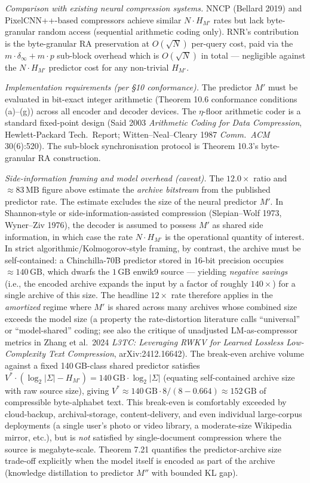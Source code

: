 \documentclass[
]{article}
\begin{document}
\emph{Comparison with existing neural compression systems.}
NNCP (Bellard 2019) and PixelCNN++-based compressors achieve similar
$N \cdot H_{M'}$ rates but lack byte-granular random access (sequential
arithmetic coding only). RNR's contribution is the byte-granular RA
preservation at $O(\sqrt{N})$ per-query cost, paid via the
$m \cdot \delta_\infty + m \cdot p$ sub-block overhead which is
$O(\sqrt{N})$ in total — negligible against the $N \cdot H_{M'}$
predictor cost for any non-trivial $H_{M'}$.

\emph{Implementation requirements (per §10 conformance).} The
predictor $M'$ must be evaluated in bit-exact integer arithmetic
(Theorem 10.6 conformance conditions (a)--(g)) across all encoder
and decoder devices. The $\eta$-floor arithmetic coder is a standard
fixed-point design (Said 2003 \emph{Arithmetic Coding for Data
Compression}, Hewlett-Packard Tech.\ Report; Witten--Neal--Cleary
1987 \emph{Comm.\ ACM} 30(6):520). The sub-block synchronisation
protocol is Theorem 10.3's byte-granular RA construction.

\emph{Side-information framing and model overhead (caveat).}
The $12.0\times$ ratio and $\approx 83\,\mathrm{MB}$ figure above
estimate the \emph{archive bitstream} from the published predictor rate.
The estimate excludes the size of the neural predictor $M'$.
In Shannon-style or side-information-assisted compression
(Slepian--Wolf 1973, Wyner--Ziv 1976), the decoder is assumed to
possess $M'$ as shared side information, in which case the rate
$N \cdot H_{M'}$ is the operational quantity of interest. In strict
algorithmic/Kolmogorov-style framing, by contrast, the archive must
be self-contained: a Chinchilla-70B predictor stored in 16-bit
precision occupies $\approx 140\,\mathrm{GB}$, which dwarfs the
$1\,\mathrm{GB}$ enwik9 source --- yielding \emph{negative savings}
(i.e., the encoded archive expands the input by a factor of roughly
$140\times$) for a single archive of this size. The headline
$12\times$ rate therefore applies in the \emph{amortized} regime where
$M'$ is shared across many archives whose combined size exceeds the
model size (a property the rate-distortion literature calls
``universal'' or ``model-shared'' coding; see also the critique of
unadjusted LM-as-compressor metrics in Zhang et al.\ 2024
\emph{L3TC: Leveraging RWKV for Learned Lossless Low-Complexity Text
Compression}, arXiv:2412.16642). The break-even archive volume against
a fixed 140\,GB-class shared predictor satisfies
$V^* \cdot (\log_2|\Sigma| - H_{M'}) = 140\,\mathrm{GB} \cdot \log_2|\Sigma|$
(equating self-contained archive size with raw source size), giving
$V^* \approx 140\,\mathrm{GB} \cdot 8 / (8 - 0.664) \approx 152\,\mathrm{GB}$
of compressible byte-alphabet text. This break-even is comfortably
exceeded by cloud-backup, archival-storage, content-delivery, and
even individual large-corpus deployments (a single user's photo or
video library, a moderate-size Wikipedia mirror, etc.), but is
\emph{not} satisfied by single-document compression where the source
is megabyte-scale. Theorem
7.21 quantifies the predictor-archive size trade-off explicitly when the
model itself is encoded as part of the archive (knowledge distillation
to predictor $M''$ with bounded KL gap).
\end{document}
